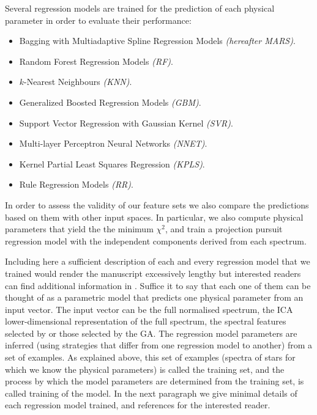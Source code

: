Several regression models are trained for the prediction of each
physical parameter in order to evaluate their performance:

\begin{itemize}

\item {Bagging with Multiadaptive Spline Regression Models \emph{(hereafter MARS)}.}

\item {Random Forest Regression Models \emph{(RF)}.}

\item {$k$-Nearest Neighbours \emph{(KNN)}.}

\item {Generalized Boosted Regression Models \emph{(GBM)}.}

\item {Support Vector Regression with Gaussian Kernel \emph{(SVR)}.}

\item {Multi-layer Perceptron Neural Networks \emph{(NNET)}.}

\item {Kernel Partial Least Squares Regression \emph{(KPLS)}.}

\item {Rule Regression Models \emph{(RR)}.}

\end{itemize}

In order to assess the validity of our feature sets we also compare
the predictions based on them with other input spaces. In particular,
we also compute physical parameters that yield the the minimum
$\chi^2$, and train a projection pursuit regression model with the
independent components \citep{Hyvarinen:1998:NAD:302528.302606}
derived from each spectrum.

Including here a sufficient description of each and every regression
model that we trained would render the manuscript excessively lengthy
but interested readers can find additional information in
\cite{baraud2002model,geman1992neural,elith2008working,
meyer2003support,svetnik2003random}.  Suffice it to say that each one
of them can be thought of as a parametric model that predicts one
physical parameter from an input vector. The input vector can be the
full normalised spectrum, the ICA lower-dimensional representation of
the full spectrum, the spectral features selected by \cite{cesetti} or
those selected by the GA. The regression model parameters are inferred
(using strategies that differ from one regression model to another)
from a set of examples. As explained above, this set of examples
(spectra of stars for which we know the physical parameters) is called
the training set, and the process by which the model parameters are
determined from the training set, is called training of the model. In
the next paragraph we give minimal details of each regression model
trained, and references for the interested reader.

